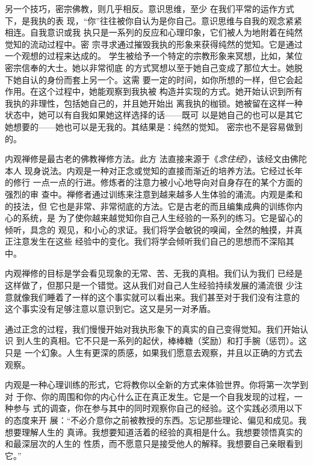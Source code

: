 另一个技巧，密宗佛教，则几乎相反。意识思维，至少
在我们平常的运作方式下，是我执的表
现，“你”往往被你自认为是你自己。意识思维与自我的观念紧紧相连。自我意识或我
执只是一系列的反应和心理印象，它们被人为地附着在纯然觉知的流动过程中。\1密
宗寻求通过摧毁我执的形象来获得纯然的觉知。它是通过一个观想的过程来达成的。
学生被给予一个特定的宗教形象来冥想，比如，某位密宗信奉的大士。她以非常彻底
的方式冥想以至于她自己变成了那位大士。她脱下她自认的身份而套上另一个。这需
要一定的时间，如你所想的一样，但它会起作用。在这个过程中，她能观察到我执被
构造并实现的方式。她开始认识到所有我执的非理性，包括她自己的，并且她开始出
离我执的枷锁。她被留在这样一种状态中，她可以有自我如果她这样选择的话——既可
以是她自己的也可以是其它她想要的——她也可以是无我的。其结果是：纯然的觉知。
密宗也不是容易做到的。

内观禅修是最古老的佛教禅修方法。此方
法直接来源于《{\it 念住经}》，该经文由佛陀本人
现身说法。内观是一种对正念或觉知的直接而渐近的培养方法。它经过长年的修行
一点一点的行进。修炼者的注意力被小心地导向对自身存在的某个方面的强烈的审
查中。禅修者通过训练来注意到越来越多人生体验的涌流。内观是柔和的技法，但
它也是非常、非常彻底的方法。它是古老的而且编集成典的训练你内心的系统，是
为了使你越来越觉知你自己人生经验的一系列的练习。它是留心的倾听，具念的
观见，和小心的求证。我们将学会敏锐的嗅闻，全然的触摸，并真正注意发生在这些
经验中的变化。我们将学会倾听我们自己的思想而不深陷其中。

内观禅修的目标是学会看见现象的无常、苦、无我的真相。我们认为我们
已经是这样做了，但那只是一个错觉。这从\1我们对自己人生经验持续发展的涌流很
少注意就像我们睡着了一样的这个事实就可以看出来。我们甚至对于我们没有注意的
这个事实没有足够注意以意识到它。这又是另一对矛盾。

通过正念的过程，我们慢慢开始对我执形象下的真实的自己变得觉知。我们开始认识
到人生的真相。它不只是一系列的起伏，棒棒糖（奖励）和打手腕（惩罚）。这只是
一个幻象。人生有更深的质感，如果我们愿意去观察，并且以正确的方式去观察。

内观是一种心理训练的形式，它将教你以全新的方式来体验世界。你将第一次学到对
于你、你的周围和你的内心什么正在真正发生。它是一个自我发现的过程，一种参与
式的调查，你在参与其中的同时观察你自己的经验。这个实践必须用以下的态度来开
展：“不必介意你之前被教授的东西。忘记那些理论、偏见和成见。我想要理解人生的
真谛。我想要知道活着的经验的真相是什么。我想要领悟真实的和最深层次的人生的
性质，而不愿意只是接受他人的解释。我想要自己亲眼看到它。”

